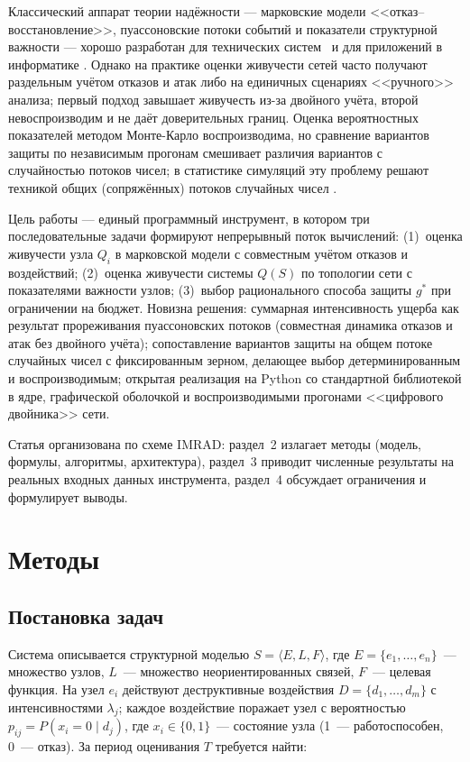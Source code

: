 \documentclass[12pt]{article}
\begin{document}
\begin{sloppypar}
Классический аппарат теории надёжности --- марковские модели
<<отказ--восстановление>>, пуассоновские потоки событий и показатели
структурной важности --- хорошо разработан для технических
систем~\cite{gnedenko,barlow,ventcel} и для приложений в информатике
\cite{trivedi,rausand}. Однако на практике оценки живучести сетей часто
получают раздельным учётом отказов и атак либо на единичных сценариях
<<ручного>> анализа; первый подход завышает живучесть из-за двойного
учёта, второй невоспроизводим и не даёт доверительных границ. Оценка
вероятностных показателей методом Монте-Карло воспроизводима, но сравнение
вариантов защиты по независимым прогонам смешивает различия вариантов с
случайностью потоков чисел; в статистике симуляций эту проблему решают
техникой общих (сопряжённых) потоков случайных чисел
\cite{glasserman,ross}.
\end{sloppypar}

Цель работы --- единый программный инструмент, в котором три
последовательные задачи формируют непрерывный поток вычислений:
(1)~оценка живучести узла $Q_i$ в марковской модели с совместным учётом
отказов и воздействий; (2)~оценка живучести системы $Q(S)$ по топологии
сети с показателями важности узлов; (3)~выбор рационального способа
защиты $g^{*}$ при ограничении на бюджет. Новизна решения: суммарная
интенсивность ущерба как результат прореживания пуассоновских потоков
(совместная динамика отказов и атак без двойного учёта); сопоставление
вариантов защиты на общем потоке случайных чисел с фиксированным зерном,
делающее выбор детерминированным и воспроизводимым; открытая реализация на
Python со стандартной библиотекой в ядре, графической оболочкой и
воспроизводимыми прогонами <<цифрового двойника>> сети.

Статья организована по схеме IMRAD: раздел~2 излагает методы (модель,
формулы, алгоритмы, архитектура), раздел~3 приводит численные результаты
на реальных входных данных инструмента, раздел~4 обсуждает ограничения
и формулирует выводы.

\section{Методы}

\subsection{Постановка задач}

Система описывается структурной моделью $S = \langle E, L, F \rangle$, где
$E = \{e_1, \dots, e_n\}$~--- множество узлов, $L$~--- множество
неориентированных связей, $F$~--- целевая функция. На узел $e_i$ действуют
деструктивные воздействия $D = \{d_1, \dots, d_m\}$ с интенсивностями
$\lambda_j$; каждое воздействие поражает узел с вероятностью
$p_{ij} = P(x_i = 0 \mid d_j)$, где $x_i \in \{0, 1\}$~--- состояние узла
(1~--- работоспособен, 0~--- отказ). За период оценивания $T$ требуется
найти:
\end{document}
